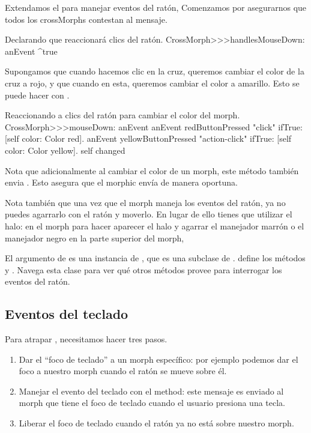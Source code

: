 \documentclass[a4paper,10pt,twoside]{book}
\begin{document}
Extendamos el  para manejar eventos del rat\'on, 
Comenzamos por asegurarnos que todos los crossMorphs contestan  al mensaje. 

\begin{method}{Declarando que  reaccionar\'a clics del rat\'on.}
CrossMorph>>>handlesMouseDown: anEvent
	^true
\end{method}

Supongamos que cuando hacemos clic en la cruz, queremos cambiar el color de la cruz a rojo, y que cuando \actclick en esta, queremos cambiar el color a amarillo.
Esto se puede hacer con .

\begin{method}[mouseDown]{Reaccionando a clics del rat\'on para cambiar el color del morph.}
CrossMorph>>>mouseDown: anEvent
	anEvent redButtonPressed "click"
		ifTrue: [self color: Color red].
	anEvent yellowButtonPressed "action-click"
		ifTrue: [self color: Color yellow].
	self changed
\end{method}

Nota que adicionalmente al cambiar el color de un morph, este m\'etodo tambi\'en envia .
Esto asegura que el morphic env\'ia  de manera oportuna.

Nota tambi\'en que una vez que el morph maneja los eventos del rat\'on, ya no puedes agarrarlo con el rat\'on y moverlo.
En lugar de ello tienes que utilizar el halo: \metaclick en el morph para hacer aparecer el halo y agarrar el manejador marr\'on \moveHandle{}  o el manejador negro \grabHandle{} en la parte superior del morph,

El argumento  de  es una instancia de \mbox{,} que es una subclase de  .  define los m\'etodos  y . Navega esta clase para ver qu\'e otros m\'etodos provee para interrogar los eventos del rat\'on.

\subsection{Eventos del teclado}

Para atrapar , necesitamos hacer tres pasos.
\begin{enumerate}
	\item Dar el ``foco de teclado'' a un morph espec\'ifico: por ejemplo podemos dar el foco a nuestro morph cuando el rat\'on se mueve sobre \'el.
	\item Manejar el evento del teclado con el  method: este mensaje es enviado al morph que tiene el foco de teclado cuando el usuario presiona una tecla.
	\item Liberar el foco de teclado cuando el rat\'on ya no est\'a sobre nuestro morph.
\end{enumerate}
\end{document}
